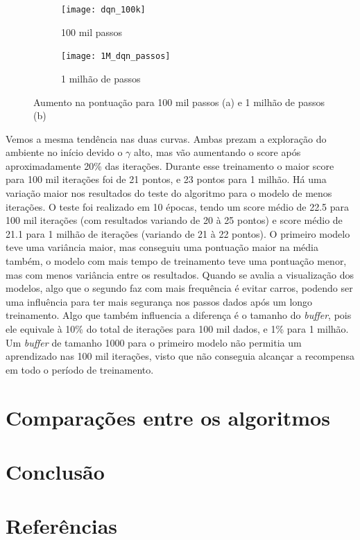 \documentclass[letterpaper]{article} %
\begin{document}
\begin{figure}[h]
     \begin{subfigure}[h]{0.2\textwidth}
         \centering
         \texttt{[image: dqn\_100k]}
         \caption{100 mil passos}
     \end{subfigure}
     \hfill
     \begin{subfigure}[h]{0.2\textwidth}
         \texttt{[image: 1M\_dqn\_passos]}
         \caption{1 milhão de passos}
     \end{subfigure}
        \caption{Aumento na pontuação para 100 mil passos (a) e 1 milhão de passos (b)}
\end{figure}

Vemos a mesma tendência nas duas curvas. Ambas prezam a exploração do ambiente no início devido o $\gamma$ alto, mas vão aumentando o score após aproximadamente 20\% das iterações. Durante esse treinamento o maior score para 100 mil iterações foi de 21 pontos, e 23 pontos para 1 milhão. Há uma variação maior nos resultados do teste do algoritmo para o modelo de menos iterações. O teste foi realizado em 10 épocas, tendo um score médio de 22.5 para 100 mil iterações (com resultados variando de 20 à 25 pontos) e score médio de 21.1 para 1 milhão de iterações (variando de 21 à 22 pontos). O primeiro modelo teve uma variância maior, mas conseguiu uma pontuação maior na média também, o modelo com mais tempo de treinamento teve uma pontuação menor, mas com menos variância entre os resultados. Quando se avalia a visualização dos modelos, algo que o segundo faz com mais frequência é evitar carros, podendo ser uma influência para ter mais segurança nos passos dados após um longo treinamento. Algo que também influencia a diferença é o tamanho do \textit{buffer}, pois ele equivale à 10\% do total de iterações para 100 mil dados, e 1\% para 1 milhão. Um \textit{buffer} de tamanho 1000 para o primeiro modelo não permitia um aprendizado nas 100 mil iterações, visto que não conseguia alcançar a recompensa em todo o período de treinamento.


\section{Comparações entre os algoritmos}



\section{Conclusão}

\section{Referências}
\end{document}
